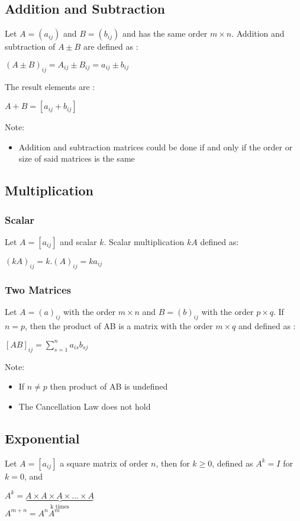 \documentclass[a4paper,12pt]{article}
\begin{document}
\subsection*{Addition and Subtraction}
Let \(A=(a_{ij})\) and \(B=(b_{ij})\) and has the same order \(m\times n\). Addition and subtraction of \(A\pm B\) are defined as :
\begin{center}
  \((A\pm B)_{ij}=A_{ij}\pm B_{ij}=a_{ij}\pm b_{ij}\)
\end{center}
The result elements are :
\begin{center}
  \(A+B=[a_{ij}+b_{ij}]\)
\end{center}
Note:
\begin{itemize}
  \item Addition and subtraction matrices could be done if and only if the order or size of said matrices is the same
\end{itemize}

\subsection*{Multiplication}
\subsubsection*{Scalar}
Let \(A=[a_{ij}]\) and scalar \(k\). Scalar multiplication \(kA\) defined as:
\begin{center}
  \((kA)_{ij}=k.(A)_{ij}=ka_{ij}\)
\end{center}
\subsubsection*{Two Matrices}
Let \(A=(a)_{ij}\) with the order \(m\times n\) and \(B=(b)_{ij}\) with the order \(p\times q\). If \(n=p\), then the product of AB is a matrix with the order \(m\times q\) and defined as :
\begin{center}
  \([AB]_{ij}=\sum\limits_{s=1}^{n} a_{is}b_{sj} \)
\end{center}
Note:
\begin{itemize}
  \item If \(n\neq p\) then product of AB is undefined
  \item The Cancellation Law does not hold
\end{itemize}


\subsection*{Exponential}
Let \(A=[a_{ij}]\) a square matrix of order \(n\), then for \(k \geq0\), defined as \(A^k=I\) for \(k=0\), and
\begin{center}
  \(A^k=\underbrace{A\times A\times A\times ... \times A}_{\text{k times}}\) \\
  \(A^{m+n}=A^nA^m\)
\end{center}
\end{document}
